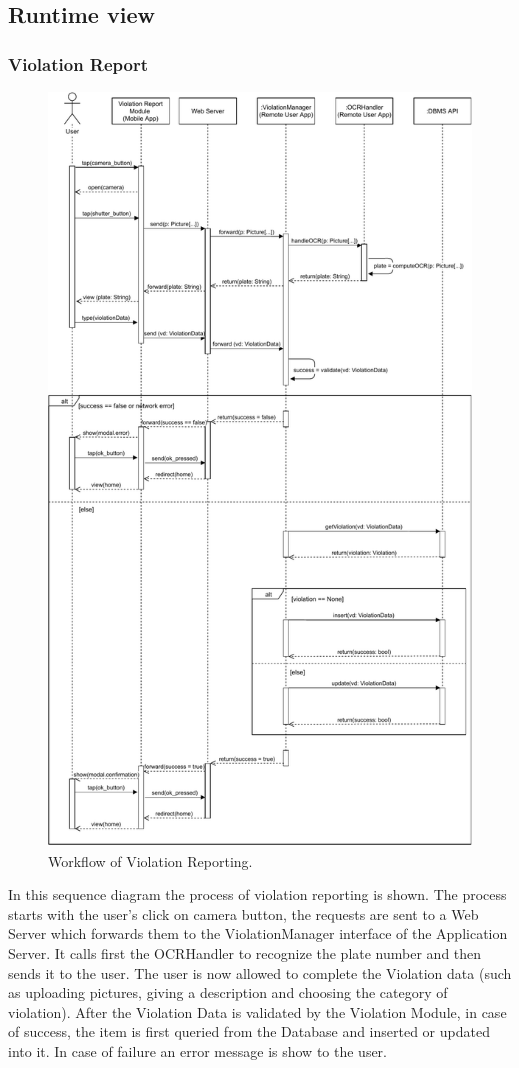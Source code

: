 \documentclass[12pt,a4paper]{article}
\begin{document}
\subsection{Runtime view}
\subsubsection{Violation Report}
\begin{figure}[H]
		\centering
		\includegraphics[width=0.7\linewidth]{../assets/sequence_diagrams/exports/workflw_violation_report_complete.pdf}
		\caption{Workflow of Violation Reporting.}
	\end{figure}
In this sequence diagram the process of violation reporting is shown. The process starts with the user's click on camera button, the requests are sent to a Web Server which forwards them to the ViolationManager interface of the Application Server. It calls first the OCRHandler to recognize the plate number and then sends it to the user. The user is now allowed to complete the Violation data (such as uploading pictures, giving a description and choosing the category of violation). After the Violation Data is validated by the Violation Module, in case of success, the item is first queried from the Database and inserted or updated into it. In case of failure an error message is show to the user.
\newpage
\end{document}
